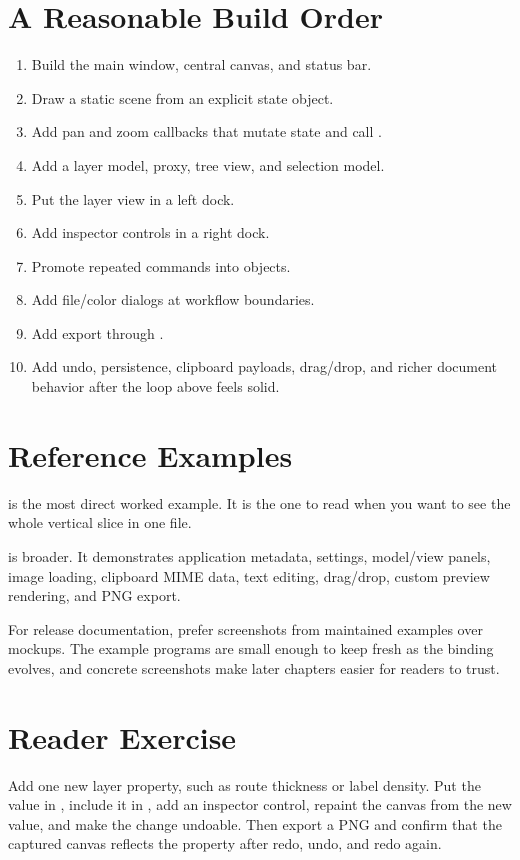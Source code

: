\section{A Reasonable Build Order}

\begin{enumerate}
\item Build the main window, central canvas, and status bar.
\item Draw a static scene from an explicit state object.
\item Add pan and zoom callbacks that mutate state and call .
\item Add a layer model, proxy, tree view, and selection model.
\item Put the layer view in a left dock.
\item Add inspector controls in a right dock.
\item Promote repeated commands into  objects.
\item Add file/color dialogs at workflow boundaries.
\item Add export through .
\item Add undo, persistence, clipboard payloads, drag/drop, and richer document behavior after the loop above feels solid.
\end{enumerate}

\section{Reference Examples}

 is the most direct worked example. It is the one to read when you want to see the whole vertical slice in one file.

 is broader. It demonstrates application metadata, settings, model/view panels, image loading, clipboard MIME data, text editing, drag/drop, custom preview rendering, and PNG export.

For release documentation, prefer screenshots from maintained examples over mockups. The example programs are small enough to keep fresh as the binding evolves, and concrete screenshots make later chapters easier for readers to trust.

\section{Reader Exercise}

Add one new layer property, such as route thickness or label density. Put the value in , include it in , add an inspector control, repaint the canvas from the new value, and make the change undoable. Then export a PNG and confirm that the captured canvas reflects the property after redo, undo, and redo again.
